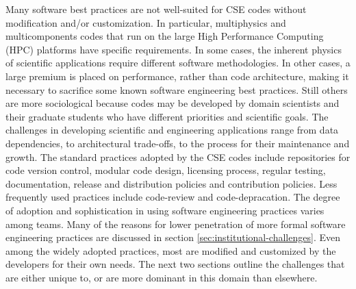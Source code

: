 Many software best practices are not well-suited for CSE codes without
modification and/or customization.  In particular, multiphysics and
multicomponents codes that run on the large High Performance Computing
(HPC) platforms have specific requirements.  In some cases, the
inherent physics of scientific applications require different software
methodologies.  In other cases, a large premium is placed on
performance, rather than code architecture, making it necessary to
sacrifice some known software engineering best practices.  Still
others are more sociological because codes may be developed by domain
scientists and their graduate students who have different priorities
and scientific goals.  
The challenges in developing scientific and engineering applications range
from data dependencies, to architectural trade-offs, to the process for their maintenance and
growth. 
The standard practices adopted by the CSE codes include
repositories for code version control, modular code design, licensing
process, regular testing, documentation, release and distribution
policies and contribution policies. Less frequently used practices
include code-review and code-depracation. 
The degree of adoption and
sophistication in using software engineering practices varies among teams. Many of
the reasons for lower penetration of more formal software engineering practices are discussed in section
\ref{sec:institutional-challenges}. Even among the widely adopted
practices, most are modified and customized by the developers for
their own needs. The next two sections outline the challenges that
are either unique to, or are more dominant in this domain than
elsewhere.  


